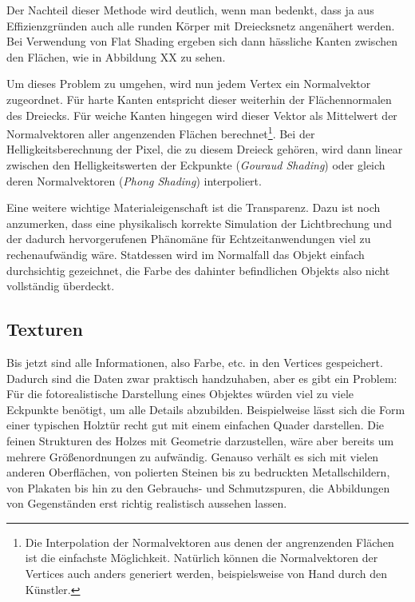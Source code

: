 
Der Nachteil dieser Methode wird deutlich, wenn man bedenkt, dass ja aus Effizienzgründen auch alle runden Körper mit Dreiecksnetz angenähert werden. Bei Verwendung von Flat Shading ergeben sich dann hässliche Kanten zwischen den Flächen, wie in Abbildung XX zu sehen.


Um dieses Problem zu umgehen, wird nun jedem Vertex ein Normalvektor zugeordnet. Für harte Kanten entspricht dieser weiterhin der Flächennormalen des Dreiecks. Für weiche Kanten hingegen wird dieser Vektor als Mittelwert der Normalvektoren aller angenzenden Flächen berechnet\footnote{Die Interpolation der Normalvektoren aus denen der angrenzenden Flächen ist die einfachste Möglichkeit. Natürlich können die Normalvektoren der Vertices auch anders generiert werden, beispielsweise von Hand durch den Künstler.}. Bei der Helligkeitsberechnung der Pixel, die zu diesem Dreieck gehören, wird dann linear zwischen den Helligkeitswerten der Eckpunkte (\emph{Gouraud Shading}) oder gleich deren Normalvektoren (\emph{Phong Shading}) interpoliert.


Eine weitere wichtige Materialeigenschaft ist die Transparenz. Dazu ist noch anzumerken, dass eine physikalisch korrekte Simulation der Lichtbrechung und der dadurch hervorgerufenen Phänomäne für Echtzeitanwendungen viel zu rechenaufwändig wäre. Statdessen wird im Normalfall das Objekt einfach durchsichtig gezeichnet, die Farbe des dahinter befindlichen Objekts also nicht vollständig überdeckt.

\subsection{Texturen}
\label{texturing}
Bis jetzt sind alle Informationen, also Farbe, etc. in den Vertices gespeichert. Dadurch sind die Daten zwar praktisch handzuhaben, aber es gibt ein Problem: Für die fotorealistische Darstellung eines Objektes würden viel zu viele Eckpunkte benötigt, um alle Details abzubilden. Beispielweise lässt sich die Form einer typischen Holztür recht gut mit einem einfachen Quader darstellen. Die feinen Strukturen des Holzes mit Geometrie darzustellen, wäre aber bereits um mehrere Größenordnungen zu aufwändig. Genauso verhält es sich mit vielen anderen Oberflächen, von polierten Steinen bis zu bedruckten Metallschildern, von Plakaten bis hin zu den Gebrauchs- und Schmutzspuren, die Abbildungen von Gegenständen erst richtig realistisch aussehen lassen.

